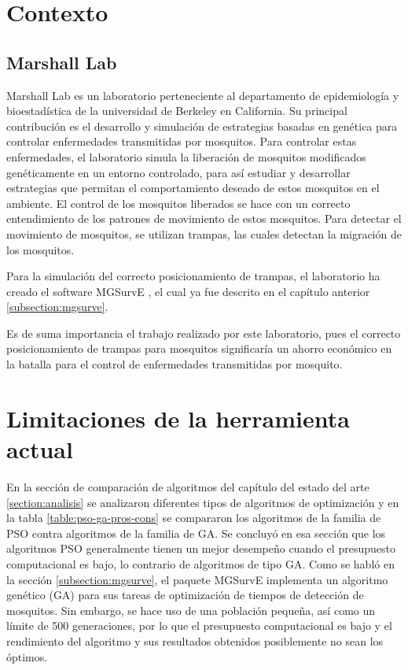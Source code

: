 \documentclass[letterpaper]{report}
\begin{document}
  \section{Contexto}
    \subsection{Marshall Lab}
    Marshall Lab \cite{MarshallLab} es un laboratorio perteneciente al
    departamento de epidemiología y bioestadística de la universidad de Berkeley
    en California. Su principal contribución es el desarrollo y simulación de
    estrategias basadas en genética para controlar enfermedades transmitidas por
    mosquitos. Para controlar estas enfermedades, el laboratorio simula la
    liberación de mosquitos modificados genéticamente en un entorno controlado,
    para así estudiar y desarrollar estrategias que permitan el comportamiento
    deseado de estos mosquitos en el ambiente. El control de los mosquitos
    liberados se hace con un correcto entendimiento de los patrones de
    movimiento de estos mosquitos. Para detectar el movimiento de mosquitos, se
    utilizan trampas, las cuales detectan la migración de los mosquitos.

    Para la simulación del correcto posicionamiento de trampas, el laboratorio
    ha creado el software MGSurvE \cite{MGSurvE}, el cual ya fue descrito en el
    capítulo anterior \ref{subsection:mgsurve}.

    Es de suma importancia el trabajo realizado por este laboratorio, pues el
    correcto posicionamiento de trampas para mosquitos significaría un ahorro
    económico en la batalla para el control de enfermedades transmitidas por
    mosquito.

  \section{Limitaciones de la herramienta actual}
    En la sección de comparación de algoritmos del capítulo del
    estado del arte
    \ref{section:analisis} se analizaron diferentes tipos de algoritmos de
    optimización y en la tabla \ref{table:pso-ga-pros-cons} se compararon los
    algoritmos de la familia de PSO contra algoritmos de la familia de GA. Se
    concluyó en esa sección que los algoritmos PSO generalmente tienen un mejor
    desempeño cuando el presupuesto computacional es bajo, lo contrario de
    algoritmos de tipo GA. Como se habló en la sección \ref{subsection:mgsurve},
    el paquete MGSurvE implementa un algoritmo genético (GA) para sus tareas de
    optimización de tiempos de detección de mosquitos. Sin embargo, se hace uso
    de una población pequeña, así como un límite de 500 generaciones, por lo que
    el presupuesto computacional es bajo y el rendimiento del algoritmo y sus
    resultados obtenidos posiblemente no sean los óptimos.
\end{document}

